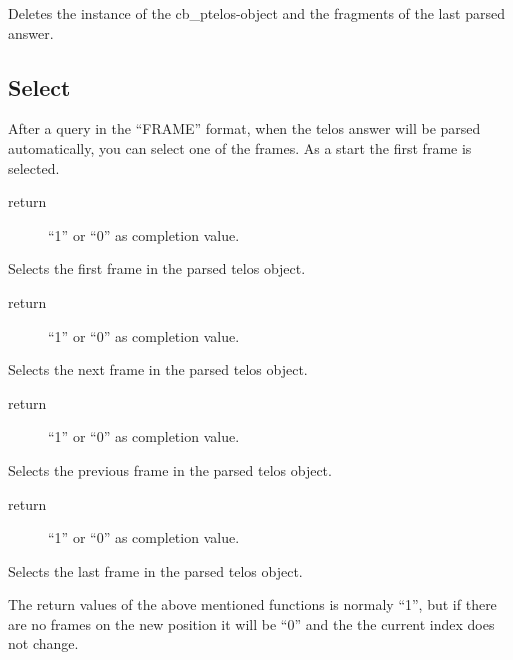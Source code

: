 	\begin{method}{ }
	Deletes the instance of the cb\_ptelos-object and 
	 the fragments of the last parsed answer.
	\end{method}
 \subsection{Select}	
	After a query in the ``FRAME'' format, when the telos answer will 
	 be parsed automatically, you can select one of the frames. 
	As a start the first frame is selected. \\

	\begin{method}{ } 
    	  \begin{description}
	     \item[ return] ``1'' or ``0'' as completion value.
	  \end{description}
	Selects the first frame in the parsed telos object.
	\end{method}

   \begin{method}{ }
    	  \begin{description}
	     \item[ return] ``1'' or ``0'' as completion value.
	  \end{description}
	Selects the next frame in the parsed telos object.
	\end{method}

   \begin{method}{ }
    	  \begin{description}
	     \item[ return] ``1'' or ``0'' as completion value.
	  \end{description}
	Selects the previous frame in the parsed telos object.
	\end{method}

	\begin{method}{ }
    	  \begin{description}
	     \item[ return] ``1'' or ``0'' as completion value.
	  \end{description}
	Selects the last frame in the parsed telos object.
	\end{method}
	The return values of the above mentioned functions is  normaly ``1'', 
	but if there are no frames on the new position it will be ``0'' 
	and the the current index does not change.

